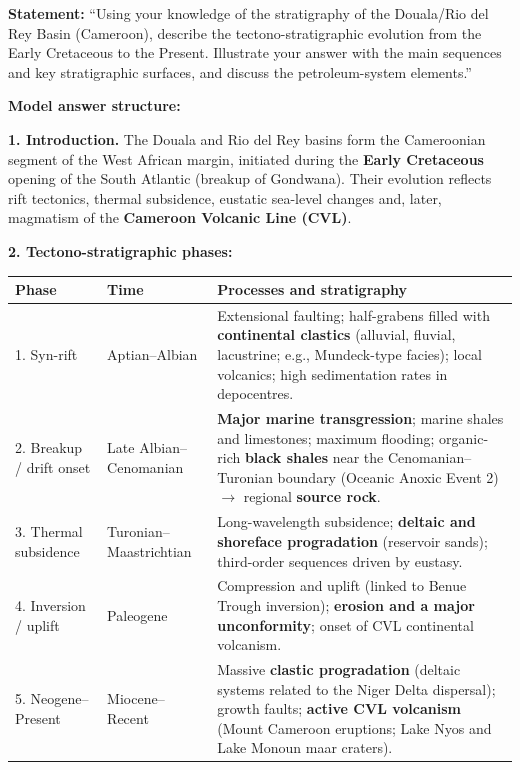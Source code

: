 \documentclass[11pt]{article}
\begin{document}
\begin{exoresolu}
\textbf{Statement:} ``Using your knowledge of the stratigraphy of the Douala/Rio del Rey Basin (Cameroon), describe the tectono-stratigraphic evolution from the Early Cretaceous to the Present. Illustrate your answer with the main sequences and key stratigraphic surfaces, and discuss the petroleum-system elements.''

\tcblower
\textbf{Model answer structure:}

\textbf{1. Introduction.} The Douala and Rio del Rey basins form the Cameroonian segment of the West African margin, initiated during the \textbf{Early Cretaceous} opening of the South Atlantic (breakup of Gondwana). Their evolution reflects rift tectonics, thermal subsidence, eustatic sea-level changes and, later, magmatism of the \textbf{Cameroon Volcanic Line (CVL)}.

\textbf{2. Tectono-stratigraphic phases:}

\begin{center}
\begin{tabularx}{\linewidth}{|l|l|X|}\hline
\rowcolor{popblueL}\textbf{Phase} & \textbf{Time} & \textbf{Processes and stratigraphy} \\ \hline
1. Syn-rift & Aptian--Albian & Extensional faulting; half-grabens filled with \textbf{continental clastics} (alluvial, fluvial, lacustrine; e.g., Mundeck-type facies); local volcanics; high sedimentation rates in depocentres. \\ \hline
2. Breakup / drift onset & Late Albian--Cenomanian & \textbf{Major marine transgression}; marine shales and limestones; maximum flooding; organic-rich \textbf{black shales} near the Cenomanian--Turonian boundary (Oceanic Anoxic Event 2) $\rightarrow$ regional \textbf{source rock}. \\ \hline
3. Thermal subsidence & Turonian--Maastrichtian & Long-wavelength subsidence; \textbf{deltaic and shoreface progradation} (reservoir sands); third-order sequences driven by eustasy. \\ \hline
4. Inversion / uplift & Paleogene & Compression and uplift (linked to Benue Trough inversion); \textbf{erosion and a major unconformity}; onset of CVL continental volcanism. \\ \hline
5. Neogene--Present & Miocene--Recent & Massive \textbf{clastic progradation} (deltaic systems related to the Niger Delta dispersal); growth faults; \textbf{active CVL volcanism} (Mount Cameroon eruptions; Lake Nyos and Lake Monoun maar craters). \\ \hline
\end{tabularx}
\end{center}


\end{exoresolu}
\end{document}
